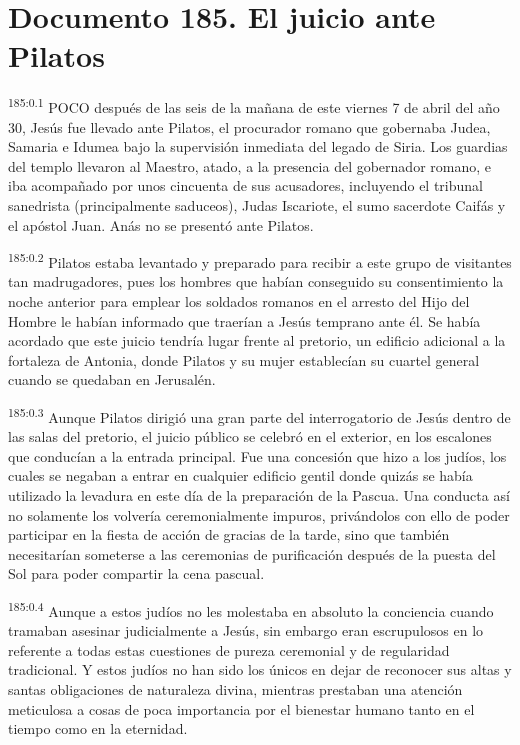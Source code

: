 \chapter{Documento 185. El juicio ante Pilatos}
\par 
\textsuperscript{185:0.1} POCO después de las seis de la mañana de este viernes 7 de abril del año 30, Jesús fue llevado ante Pilatos, el procurador romano que gobernaba Judea, Samaria e Idumea bajo la supervisión inmediata del legado de Siria. Los guardias del templo llevaron al Maestro, atado, a la presencia del gobernador romano, e iba acompañado por unos cincuenta de sus acusadores, incluyendo el tribunal sanedrista
(principalmente saduceos), Judas Iscariote, el sumo sacerdote Caifás y el apóstol Juan. Anás no se presentó ante Pilatos.

\par 
\textsuperscript{185:0.2} Pilatos estaba levantado y preparado para recibir a este grupo de visitantes tan madrugadores, pues los hombres que habían conseguido su consentimiento la noche anterior para emplear los soldados romanos en el arresto del Hijo del Hombre le habían informado que traerían a Jesús temprano ante él. Se había acordado que este juicio tendría lugar frente al pretorio, un edificio adicional a la fortaleza de Antonia, donde Pilatos y su mujer establecían su cuartel general cuando se quedaban en Jerusalén.

\par 
\textsuperscript{185:0.3} Aunque Pilatos dirigió una gran parte del interrogatorio de Jesús dentro de las salas del pretorio, el juicio público se celebró en el exterior, en los escalones que conducían a la entrada principal. Fue una concesión que hizo a los judíos, los cuales se negaban a entrar en cualquier edificio gentil donde quizás se había utilizado la levadura en este día de la preparación de la Pascua. Una conducta así no solamente los volvería ceremonialmente impuros, privándolos con ello de poder participar en la fiesta de acción de gracias de la tarde, sino que también necesitarían someterse a las ceremonias de purificación después de la puesta del Sol para poder compartir la cena pascual.

\par 
\textsuperscript{185:0.4} Aunque a estos judíos no les molestaba en absoluto la conciencia cuando tramaban asesinar judicialmente a Jesús, sin embargo eran escrupulosos en lo referente a todas estas cuestiones de pureza ceremonial y de regularidad tradicional. Y estos judíos no han sido los únicos en dejar de reconocer sus altas y santas obligaciones de naturaleza divina, mientras prestaban una atención meticulosa a cosas de poca importancia por el bienestar humano tanto en el tiempo como en la eternidad.

